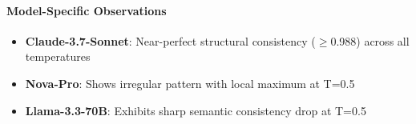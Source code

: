 \documentclass{article}
\begin{document}
\paragraph{Model-Specific Observations}
\begin{itemize}
\item \textbf{Claude-3.7-Sonnet}: Near-perfect structural consistency ($\geq$0.988) across all temperatures
\item \textbf{Nova-Pro}: Shows irregular pattern with local maximum at T=0.5
\item \textbf{Llama-3.3-70B}: Exhibits sharp semantic consistency drop at T=0.5
\end{itemize}
\end{document}
